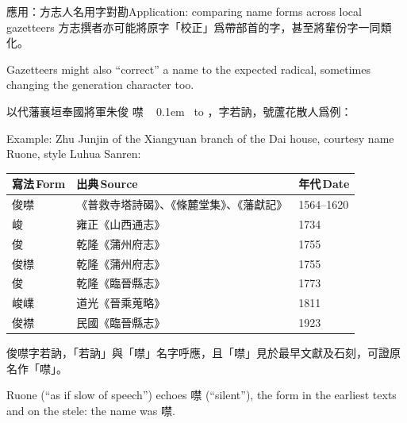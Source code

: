 \documentclass[aspectratio=169,12pt,t]{beamer}
\makeatletter
\newcommand{\cmu}[1]{\textcolor{wxmu}{#1}}
\newcommand{\wxpy}[1]{\leavevmode\begingroup
  \setbox\z@\hbox{#1}%
  \setbox\tw@\hbox{\fontsize{\dimexpr0.6\dimexpr\f@size pt\relax\relax}{0pt}\selectfont
  \pinyinfont\@nameuse{wxpy@#1}}%
  \dimen@\wd\tw@ \advance\dimen@ 0.1em
  \ifdim\dimen@<\wd\z@ \dimen@\wd\z@ \fi
  \hbox{\rlap{\raise1em\hbox to\dimen@{\hss\box\tw@\hss}}%
  \hbox to\dimen@{\hss\box\z@\hss}}%
\endgroup}
\newcommand{\entext}[1]{{\scriptsize\color{black!60}#1}}
\newcommand{\en}[1]{\par{\parskip=0pt\scriptsize\color{black!60}#1\par}}
\makeatother
\begin{document}
\begin{frame}{應用：方志人名用字對勘}{Application: comparing name forms across local gazetteers}
  方志撰者亦可能將原字「校正」爲帶部首的字，甚至將輩份字一同類化。
  \en{Gazetteers might also ``correct'' a name to the expected radical, sometimes changing the generation character too.}

  以代藩襄垣奉國將軍朱俊\cmu{\wxpy{噤}}，字若訥，號蘆花散人爲例：
  \en{Example: Zhu Junjin of the Xiangyuan branch of the Dai house, courtesy name Ruone, style Luhua Sanren:}

  {\footnotesize\renewcommand{\arraystretch}{0.92}%
  \begin{tabularx}{\linewidth}{l X l}
    \toprule
    寫法\,\entext{Form} & 出典\,\entext{Source} & 年代\,\entext{Date} \\
    \midrule
    俊噤 & 《普救寺塔詩碣》\cite[182]{三晉石刻大全運城市永濟市卷}、《條麓堂集》\cite[25:4a]{條麓堂集}、《藩獻記》\cite[4:8b]{藩獻記} & 1564--1620 \\
    峻𲞈 & 雍正《山西通志》\cite[24:25a]{雍正山西通志} & 1734 \\
    俊𲞈 & 乾隆《蒲州府志》\cite[3:17b]{乾隆蒲州府志} & 1755 \\
    俊㯲 & 乾隆《蒲州府志》\cite[24:26b]{乾隆蒲州府志} & 1755 \\
    俊𬓛 & 乾隆《臨晉縣志》\cite[2:39b]{乾隆臨晉縣志} & 1773 \\
    峻嶫 & 道光《晉乘蒐略》\cite[28:41b]{道光晉乘蒐略} & 1811 \\
    俊襟 & 民國《臨晉縣志》\cite[12:4a]{民國臨晉縣志} & 1923 \\
    \bottomrule
  \end{tabularx}\par}
  \small

  俊\cmu{噤}字若訥，「若訥」與「噤」名字呼應，且「噤」見於最早文獻及石刻，可證原名作「噤」。
  \en{Ruone (``as if slow of speech'') echoes 噤 (``silent''), the form in the earliest texts and on the stele: the name was 噤.}
\end{frame}
\end{document}
